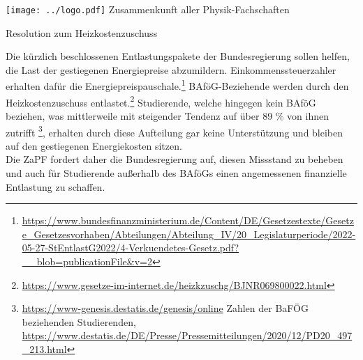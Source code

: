 \documentclass[DIV=calc]{scrartcl}
\begin{document}
\hspace{0.87\textwidth}
\begin{minipage}{120pt}
	\vspace{-1.8cm}
	\texttt{[image: ../logo.pdf]}
	\centering
	\small Zusammenkunft aller Physik-Fachschaften
\end{minipage}

\begin{center}
  \huge{Resolution zum Heizkostenzuschuss}\vspace{.25\baselineskip}\\
  \normalsize
\end{center}
\vspace{1cm}


%
%


Die kürzlich beschlossenen Entlastungspakete der Bundesregierung sollen helfen, die Last der gestiegenen Energiepreise abzumildern. Einkommenssteuerzahler erhalten dafür die Energiepreispauschale.\footnote{\url{https://www.bundesfinanzministerium.de/Content/DE/Gesetzestexte/Gesetze_Gesetzesvorhaben/Abteilungen/Abteilung_IV/20_Legislaturperiode/2022-05-27-StEntlastG2022/4-Verkuendetes-Gesetz.pdf?__blob=publicationFile&v=2}} BAföG-Beziehende werden durch den Heizkostenzuschuss entlastet.\footnote{\url{https://www.gesetze-im-internet.de/heizkzuschg/BJNR069800022.html}}
Studierende, welche hingegen kein BAföG beziehen, was mittlerweile mit steigender Tendenz auf über 89 \% von ihnen zutrifft
\footnote{\url{https://www-genesis.destatis.de/genesis/online} Zahlen der BaFÖG beziehenden Studierenden, \url{https://www.destatis.de/DE/Presse/Pressemitteilungen/2020/12/PD20_497_213.html}}, erhalten durch diese Aufteilung gar keine Unterstützung und bleiben auf den gestiegenen Energiekosten sitzen.\\
Die ZaPF fordert daher die Bundesregierung auf, diesen Missstand zu beheben und auch für Studierende außerhalb des BAföGs einen angemessenen finanzielle Entlastung zu schaffen.
\end{document}
